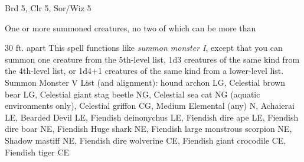 
\begin{description*}
\item[Level:] Brd 5, Clr 5, Sor/Wiz 5
\item[Effect:] One or more summoned creatures, no two of which can be more than
\end{description*}

30 ft. apart
This spell functions like \textit{summon monster I}, except that you can summon
one creature from the 5th-level list, 1d3 creatures of the same kind from the 4th-level
list, or 1d4+1 creatures of the same kind from a lower-level list.
Summon Monster V List (and alignment): hound archon LG, Celestial brown bear LG, Celestial giant stag beetle NG, Celestial sea cat NG (aquatic environments only), Celestial griffon CG, Medium Elemental (any) N, Achaierai LE, Bearded Devil LE, Fiendish deinonychus LE, Fiendish dire ape LE, Fiendish dire boar NE, Fiendish Huge shark NE, Fiendish large monstrous scorpion NE, Shadow mastiff NE, Fiendish dire wolverine CE, Fiendish giant crocodile CE, Fiendish tiger CE